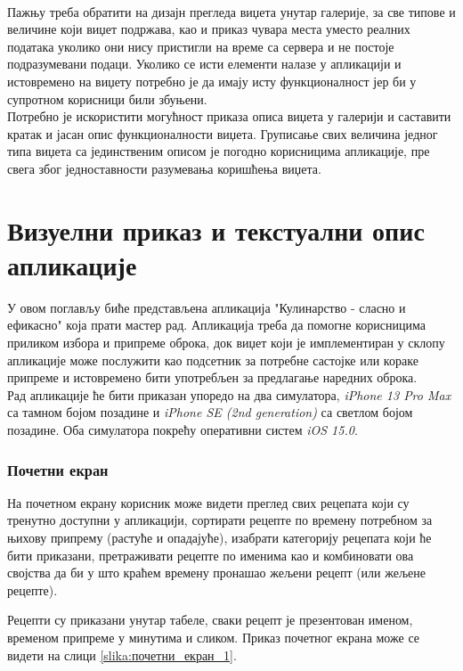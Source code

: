 \documentclass[12pt,oneside]{memoir}
\begin{document}
\\
\indent Пажњу треба обратити на дизајн прегледа виџета унутар галерије, за све типове и величине који виџет подржава, као и приказ чувара места уместо реалних података уколико они нису пристигли на време са сервера и не постоје подразумевани подаци. Уколико се исти елементи налазе у апликацији и истовремено на виџету потребно је да имају исту функционалност јер би у супротном корисници били збуњени. 
\\
\indent Потребно је искористити могућност приказа описа виџета у галерији и саставити кратак и јасан опис функционалности виџета. Груписање свих величина једног типа виџета са јединственим описом је погодно корисницима апликације, пре свега због једноставности разумевања коришћења виџета.

\chapter{Визуелни приказ и текстуални опис апликације}

\indent У овом поглављу биће представљена апликација "Кулинарство - сласно и ефикасно" која прати мастер рад. Апликација треба да помогне корисницима приликом избора и припреме оброка, док виџет који је имплементиран у склопу апликације може послужити као подсетник за потребне састојке или кораке припреме и истовремено бити употребљен за предлагање наредних оброка.
\\
\indent Рад апликације ће бити приказан упоредо на два симулатора, \textit{iPhone 13 Pro Max} са тамном бојом позадине и \textit{iPhone SE (2nd generation)} са светлом бојом позадине. Оба симулатора покрећу оперативни систем \textit{iOS 15.0}.

\subsection{Почетни екран}

\indent На почетном екрану корисник може видети преглед свих рецепата који су тренутно доступни у апликацији, сортирати рецепте по времену потребном за њихову припрему (растуће и опадајуће), изабрати категорију рецепата који ће бити приказани, претраживати рецепте по именима као и комбиновати ова својства да би у што краћем времену пронашао жељени рецепт (или жељене рецепте).

\indent Рецепти су приказани унутар табеле, сваки рецепт је презентован именом, временом припреме у минутима и сликом. Приказ почетног екрана може се видети на слици \ref{slika:почетни_екран_1}.
\end{document}
